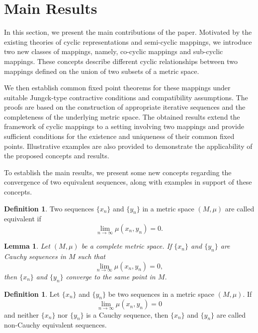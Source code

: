 \documentclass[11pt,a4paper,margin=1in]{amsart}
\theoremstyle{plain}
\newtheorem{lemma}[theorem]{Lemma}
\theoremstyle{definition}
\newtheorem{definition}[theorem]{Definition}
\theoremstyle{remark}
\begin{document}
\section{Main Results}\label{sec:Main Results}

In this section, we present the main contributions of the paper. Motivated by
the existing theories of cyclic representations and semi-cyclic mappings, we
introduce two new classes of mappings, namely, co-cyclic mappings and
sub-cyclic mappings. These concepts describe different cyclic relationships
between two mappings defined on the union of two subsets of a metric space.

We then establish common fixed point theorems for these mappings under
suitable Jungck-type contractive conditions and compatibility assumptions.
The proofs are based on the construction of appropriate iterative sequences
and the completeness of the underlying metric space. The obtained results
extend the framework of cyclic mappings to a setting involving two mappings
and provide sufficient conditions for the existence and uniqueness of their
common fixed points. Illustrative examples are also provided to demonstrate
the applicability of the proposed concepts and results.

To establish the main results, we present some new concepts regarding the convergence of two equivalent sequences, along with examples in support of these concepts.

\begin{definition}\label{def:equivalent-sequences}
Two sequences $\{x_n\}$ and $\{y_n\}$ in a metric space $(M,\mu)$ are
called equivalent if
\[
\lim_{n\to\infty}\mu(x_n,y_n)=0.
\]
\end{definition}

\begin{lemma}\label{lem:equivalent-cauchy-sequences}
Let $(M,\mu)$ be a complete metric space. If $\{x_n\}$ and $\{y_n\}$ are
Cauchy sequences in $M$ such that
\[
\lim_{n\to\infty}\mu(x_n,y_n)=0,
\]
then $\{x_n\}$ and $\{y_n\}$ converge to the same point in $M$.
\end{lemma}

\begin{definition}\label{def:non-cauchy-equivalent}
Let $\{x_n\}$ and $\{y_n\}$ be two sequences in a metric space $(M,\mu)$.
If
\[
\lim_{n\to\infty}\mu(x_n,y_n)=0
\]
and neither $\{x_n\}$ nor $\{y_n\}$ is a Cauchy sequence, then
$\{x_n\}$ and $\{y_n\}$ are called non-Cauchy equivalent sequences.
\end{definition}
\end{document}

